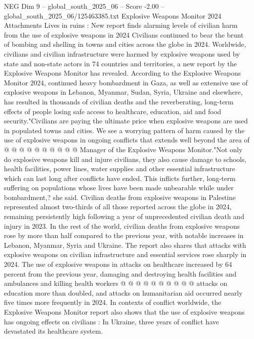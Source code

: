 \begin{textsample}{NEG Dim 9 – global\_south\_2025\_06 – Score -2.00 – global\_south\_2025\_06/125463385.txt}  \label{ex:f9_neg_278}
Explosive Weapons Monitor 2024 Attachments Lives in ruins : New report finds alarming levels of civilian harm from the use of explosive weapons in 2024 Civilians continued to bear the brunt of bombing and shelling in towns and cities across the globe in 2024.
Worldwide, civilians and civilian infrastructure were harmed by explosive weapons used by state and non-state actors in 74 countries and territories, a new report by the Explosive Weapons Monitor has revealed.
According to the Explosive Weapons Monitor 2024, continued heavy bombardment in Gaza, as well as extensive use of explosive weapons in Lebanon, Myanmar, Sudan, Syria, Ukraine and elsewhere, has resulted in thousands of civilian deaths and the reverberating, long-term effects of people losing safe access to healthcare, education, aid and food security."Civilians are paying the ultimate price when explosive weapons are used in populated towns and cities.
We see a worrying pattern of harm caused by the use of explosive weapons in ongoing conflicts that extends well beyond the area of @ @ @ @ @ @ @ @ @ @ Manager of the Explosive Weapons Monitor."Not only do explosive weapons kill and injure civilians, they also cause damage to schools, health facilities, power lines, water supplies and other essential infrastructure which can last long after conflicts have ended.
This inflicts further, long-term suffering on populations whose lives have been made unbearable while under bombardment,? she said.
Civilian deaths from explosive weapons in Palestine represented almost two-thirds of all those reported across the globe in 2024, remaining persistently high following a year of unprecedented civilian death and injury in 2023.
In the rest of the world, civilian deaths from explosive weapons rose by more than half compared to the previous year, with notable increases in Lebanon, Myanmar, Syria and Ukraine.
The report also shares that attacks with explosive weapons on civilian infrastructure and essential services rose sharply in 2024.
The use of explosive weapons in attacks on healthcare increased by 64 percent from the previous year, damaging and destroying health facilities and ambulances and killing health workers @ @ @ @ @ @ @ @ @ @ attacks on education more than doubled, and attacks on humanitarian aid occurred nearly five times more frequently in 2024.
In contexts of conflict worldwide, the Explosive Weapons Monitor report also shows that the use of explosive weapons has ongoing effects on civilians : In Ukraine, three years of conflict have devastated its healthcare system.

\end{textsample}
